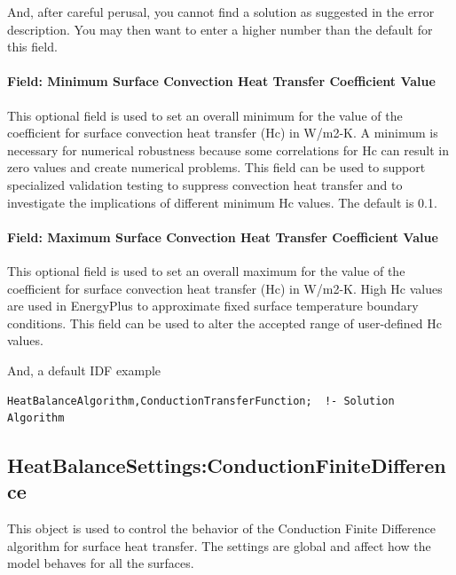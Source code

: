 And, after careful perusal, you cannot find a solution as suggested in the error description. You may then want to enter a higher number than the default for this field.

\paragraph{Field: Minimum Surface Convection Heat Transfer Coefficient Value}\label{field-minimum-surface-convection-heat-transfer-coefficient-value}

This optional field is used to set an overall minimum for the value of the coefficient for surface convection heat transfer (Hc) in W/m2-K. A minimum is necessary for numerical robustness because some correlations for Hc can result in zero values and create numerical problems. This field can be used to support specialized validation testing to suppress convection heat transfer and to investigate the implications of different minimum Hc values. The default is 0.1.

\paragraph{Field: Maximum Surface Convection Heat Transfer Coefficient Value}\label{field-maximum-surface-convection-heat-transfer-coefficient-value}

This optional field is used to set an overall maximum for the value of the coefficient for surface convection heat transfer (Hc) in W/m2-K. High Hc values are used in EnergyPlus to approximate fixed surface temperature boundary conditions. This field can be used to alter the accepted range of user-defined Hc values.

And, a default IDF example

\begin{lstlisting}
HeatBalanceAlgorithm,ConductionTransferFunction;  !- Solution Algorithm
\end{lstlisting}

\subsection{HeatBalanceSettings:ConductionFiniteDifference}\label{heatbalancesettingsconductionfinitedifference}

This object is used to control the behavior of the Conduction Finite Difference algorithm for surface heat transfer. The settings are global and affect how the model behaves for all the surfaces.

